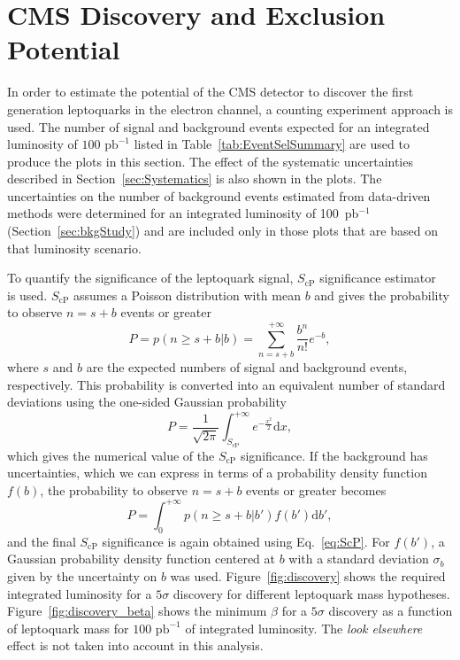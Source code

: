 %

\section{CMS Discovery and Exclusion Potential} \label{CMSpotential}

In order to estimate the potential of the CMS detector to discover the first generation leptoquarks
in the electron channel, a counting experiment approach is used. 
The number of signal and background events expected for an integrated luminosity of
$100\text{ pb}^{-1}$ listed in Table~\ref{tab:EventSelSummary} 
are used to produce the plots in this section.
The effect of the systematic uncertainties described in Section~\ref{sec:Systematics} is also shown in the plots. 
The uncertainties on the number of background events estimated from data-driven methods were determined for 
an integrated luminosity of 100~pb$^{-1}$
(Section~\ref{sec:bkgStudy}) and are included only in those plots that are based on that luminosity scenario.  


To quantify the significance of the
leptoquark signal, $S_\text{cP}$ significance estimator~\cite{Bityukov:2005hg} is used. $S_\text{cP}$ assumes a Poisson distribution
with mean $b$ and gives the probability to observe $n=s+b$ events or greater
\begin{equation}
P = p(n\geq s+b|b) = \sum_{n=s+b}^{+\infty} \frac{b^n}{n!}e^{-b},
\end{equation}
where $s$ and $b$ are the expected numbers of signal and background events, respectively. This probability is 
converted into an equivalent number of standard deviations using the one-sided Gaussian probability
\begin{equation}
P = \frac{1}{\sqrt{2\pi}}\int_{S_\text{cP}}^{+\infty} e^{-\frac{x^2}{2}}\mathrm{d}x,
\label{eq:ScP}
\end{equation}
which gives the numerical value of the $S_\text{cP}$ significance. If the background has uncertainties, which we can express in terms of
a probability density function $f(b)$, the probability to observe $n=s+b$ events or greater becomes
\begin{equation}
P = \int_0^{+\infty} p(n\geq s+b|b')f(b')\mathrm{d}b',
\end{equation}
and the final $S_\text{cP}$ significance is again obtained using Eq.~\ref{eq:ScP}. For $f(b')$, a Gaussian probability density function
centered at $b$ with a standard deviation $\sigma_b$ given by the uncertainty on $b$ was used. 
Figure~\ref{fig:discovery} shows the required integrated luminosity for a $5\sigma$ discovery for different leptoquark mass hypotheses. 
Figure~\ref{fig:discovery_beta} shows the minimum $\beta$ for a $5\sigma$ discovery as a function of leptoquark mass for $100\text{ pb}^{-1}$ 
of integrated luminosity. The {\it look elsewhere} effect is not taken into account in this analysis.

